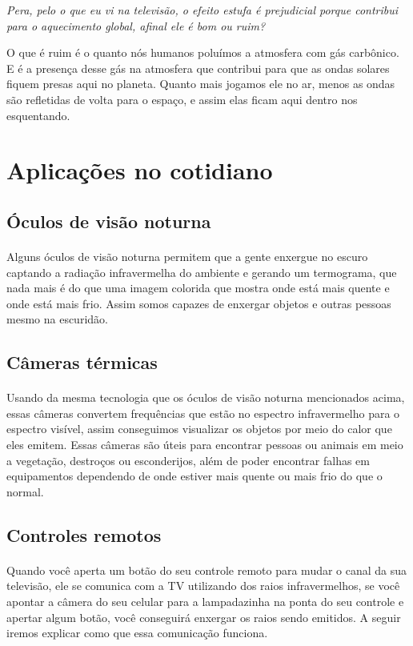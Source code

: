\textit{Pera, pelo o que eu vi na televisão, o efeito estufa é prejudicial porque contribui para o aquecimento global, afinal ele é bom ou ruim?} \par
O que é ruim é o quanto nós humanos poluímos a atmosfera com gás carbônico. E é a presença desse gás na atmosfera que contribui para que as ondas solares fiquem presas aqui no planeta. Quanto mais jogamos ele no ar, menos as ondas são refletidas de volta para o espaço, e assim elas ficam aqui dentro nos esquentando.

\section{Aplicações no cotidiano}

\subsection{Óculos de visão noturna}
\paragraph{}
Alguns óculos de visão noturna permitem que a gente enxergue no escuro captando a radiação infravermelha do ambiente e gerando um termograma, que nada mais é do que uma imagem colorida que mostra onde está mais quente e onde está mais frio. Assim somos capazes de enxergar objetos e outras pessoas mesmo na escuridão.

\subsection{Câmeras térmicas}
\paragraph{}
Usando da mesma tecnologia que os óculos de visão noturna mencionados acima, essas câmeras convertem frequências que estão no espectro infravermelho para o espectro visível, assim conseguimos visualizar os objetos por meio do calor que eles emitem. Essas câmeras são úteis para encontrar pessoas ou animais em meio a vegetação, destroços ou esconderijos, além de poder encontrar falhas em equipamentos dependendo de onde estiver mais quente ou mais frio do que o normal.

\subsection{Controles remotos}
\paragraph{}
Quando você aperta um botão do seu controle remoto para mudar o canal da sua televisão, ele se comunica com a TV utilizando dos raios infravermelhos, se você apontar a câmera do seu celular para a lampadazinha na ponta do seu controle e apertar algum botão, você conseguirá enxergar os raios sendo emitidos. A seguir iremos explicar como que essa comunicação funciona.

